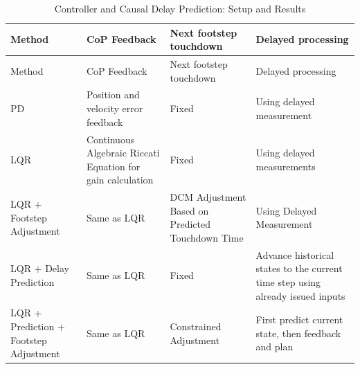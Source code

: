 \FloatBarrier\begingroup\small\setlength{\tabcolsep}{2.5pt}
\begin{longtable}[]{@{}
  >{\raggedright\arraybackslash}p{}
  >{\raggedright\arraybackslash}p{}
  >{\raggedright\arraybackslash}p{}
  >{\raggedright\arraybackslash}p{}@{}}
\caption{Controller and Causal Delay Prediction: Setup and Results}\label{tab:s17-3}\tabularnewline
\toprule\noalign{}
\begin{minipage}[b]{\linewidth}\raggedright
Method
\end{minipage} & \begin{minipage}[b]{\linewidth}\raggedright
CoP Feedback
\end{minipage} & \begin{minipage}[b]{\linewidth}\raggedright
Next footstep touchdown
\end{minipage} & \begin{minipage}[b]{\linewidth}\raggedright
Delayed processing
\end{minipage} \\
\midrule\noalign{}
\endfirsthead
\toprule\noalign{}
\begin{minipage}[b]{\linewidth}\raggedright
Method
\end{minipage} & \begin{minipage}[b]{\linewidth}\raggedright
CoP Feedback
\end{minipage} & \begin{minipage}[b]{\linewidth}\raggedright
Next footstep touchdown
\end{minipage} & \begin{minipage}[b]{\linewidth}\raggedright
Delayed processing
\end{minipage} \\
\midrule\noalign{}
\endhead
\bottomrule\noalign{}
\endlastfoot
PD & Position and velocity error feedback & Fixed & Using delayed measurement \\
LQR & Continuous Algebraic Riccati Equation for gain calculation & Fixed & Using delayed measurements \\
LQR + Footstep Adjustment & Same as LQR & DCM Adjustment Based on Predicted Touchdown Time & Using Delayed Measurement \\
LQR + Delay Prediction & Same as LQR & Fixed & Advance historical states to the current time step using already issued inputs \\
LQR + Prediction + Footstep Adjustment & Same as LQR & Constrained Adjustment & First predict current state, then feedback and plan \\
\end{longtable}\endgroup


